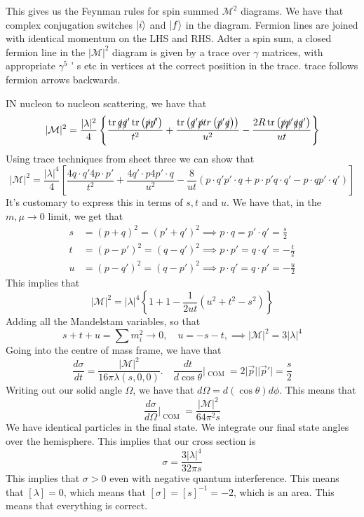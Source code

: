 This gives us the Feynman rules 
for spin summed $ \mathcal{ M } ^ 2 $ diagrams. 
We have that complex conjugation switches $ \ket{ i } $ and 
$ \ket{ f } $ in the diagram. 
Fermion lines are joined with identical momentum on the LHS and RHS. 
Adter a spin sum, a closed fermion line in the $| \mathcal{ M } | ^ 2 $ diagram 
is given by a trace over $ \gamma $ matrices, with appropriate $\gamma ^ 5 $ ' s
etc in vertices at the correct posiition in the trace. trace follows 
fermion arrows backwards. 

IN nucleon to nucleon scattering, 
we have that 
\[
| \mathcal{ M } | ^ 2 = \frac{| \lambda | ^ 2 }{ 4 } \left\{  
\frac{\tr \slashed{q}\slashed{q}' \tr \left( \slashed{p} \slashed{p'} \right) }{t ^ 2 } + 
\frac{ \tr \left( \slashed{q}' \slashed{p} tr\left( \slashed{p}' \slashed{q}  \right)  \right) }{u^ 2 }
- \frac{2 R  \tr \left( \slashed{p} \slashed{p}' \slashed{q} \slashed{q}' \right) }{ ut }\right\} 
\] 
Using trace techniques from sheet three we can show that 
\[
| \mathcal{ M } | ^ 2 = \frac{ | \lambda | ^ 4 }{4 } \left[ 
\frac{ 4 q \cdot  q ' 4 p \cdot  p ' }{ t ^ 2 } + \frac{ 4 q ' \cdot  p 4 p ' \cdot  q }{ u ^ 2 }
- \frac{8}{ut } ( p \cdot  q ' p ' \cdot  q + p \cdot  p ' q \cdot  q ' - p \cdot  q p' \cdot  q ' )\right] 
\] It's customary to 
express this in terms of $ s, t $ and $ u$. 
We have that, in the  $ m , \mu \to 0 $  limit, 
we get that 
\begin{align*}
s & = ( p + q ) ^ 2  = ( p' + q ' ) ^ 2 \implies p \cdot  q  = p ' \cdot  q'  = \frac{s}{2 } \\
t &=  ( p - p' ) ^ 2  = ( q - q ' ) ^ 2 \implies p \cdot  p ' = q \cdot  q ' =  - \frac{t}{2 }  \\
u &=  ( p - q ' ) ^ 2  = ( q - p ' ) ^ 2 \implies p \cdot  q '  = q \cdot  p ' = - \frac{u}{2 }  
\end{align*}
This implies that 
\[
| \mathcal{ M } | ^ 2  = | \lambda | ^ 4 \left\{  1 + 1  - \frac{1}{2 ut } \left( u ^ 2 + t ^ 2 - s ^ 2 \right)  \right\} 
\] Adding all the Mandelstam variables, so that 
\[
s + t + u  = \sum m _ i ^ 2  \to 0 , \quad u = - s - t, \implies | \mathcal{ M } | ^ 2  = 3 | \lambda | ^  4
\] Going into the centre of mass frame, 
we have that 
\[
\frac{ d \sigma  }{ dt } = \frac{ | \mathcal{ M } | ^ 2 }{ 16 \pi \lambda ( s, 0 , 0 ) }. \quad 
\frac{dt }{ d \cos \theta } | _{ \text{ COM } }  = 2  |\vec{p} | | \vec{p} ' |  = \frac{ s}{2}
\] Writing out our solid angle $ \Omega$, we have that 
$ d \Omega= d \left( \cos \theta  \right)  d \phi $. 
This means that 
\[
\frac{ d \sigma }{ d \Omega } |_{ \text{ COM } }  = \frac{ | \mathcal{ M } | ^ 2 }{ 64 \pi ^ 2 s }
\] We have identical particles in the final state. 
We integrate our final state angles over the hemisphere. 
This implies that our cross section is 
\[
\sigma = \frac{ 3 | \lambda | ^ 4 }{ 32 \pi s }
\] This implies that $ \sigma > 0 $ even with negative quantum 
interference. This means that $ [ \lambda ] =0 $, which means 
that $ [ \sigma ]  = [ s ] ^{ - 1} = - 2$, which is an area. 
This means that everything is correct.

